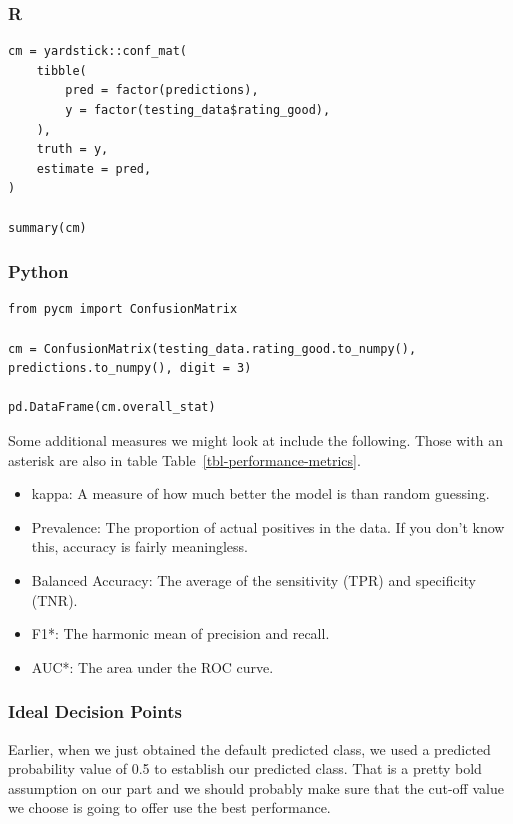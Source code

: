 \documentclass[
  letterpaper,
]{krantz}
\providecommand{\tightlist}{%
  \setlength{\itemsep}{0pt}\setlength{\parskip}{0pt}}\usepackage{longtable,booktabs,array}
\begin{document}
\subsubsection{R}

\begin{verbatim}
cm = yardstick::conf_mat(
    tibble(
        pred = factor(predictions), 
        y = factor(testing_data$rating_good), 
    ),
    truth = y,
    estimate = pred,
)

summary(cm)
\end{verbatim}

\subsubsection{Python}

\begin{verbatim}
from pycm import ConfusionMatrix

cm = ConfusionMatrix(testing_data.rating_good.to_numpy(), predictions.to_numpy(), digit = 3)

pd.DataFrame(cm.overall_stat)
\end{verbatim}

Some additional measures we might look at include the following. Those
with an asterisk are also in table Table~\ref{tbl-performance-metrics}.

\begin{itemize}
\tightlist
\item
  kappa: A measure of how much better the model is than random guessing.
\item
  Prevalence: The proportion of actual positives in the data. If you
  don't know this, accuracy is fairly meaningless.
\item
  Balanced Accuracy: The average of the sensitivity (TPR) and
  specificity (TNR).
\item
  F1*: The harmonic mean of precision and recall.
\item
  AUC*: The area under the ROC curve.
\end{itemize}

\subsubsection{Ideal Decision Points}\label{ideal-decision-points}

Earlier, when we just obtained the default predicted class, we used a
predicted probability value of 0.5 to establish our predicted class.
That is a pretty bold assumption on our part and we should probably make
sure that the cut-off value we choose is going to offer use the best
performance.
\end{document}
